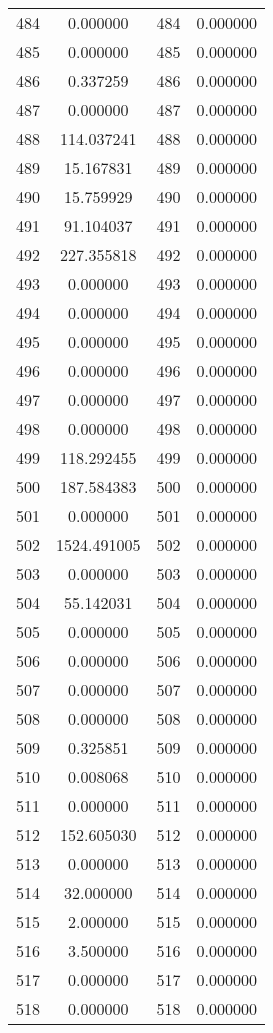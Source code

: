 \documentclass[12pt]{article}
\begin{document}
\begin{longtable}{@{}cccc@{}}
484 & 0.000000 & 484 & 0.000000 \\
485 & 0.000000 & 485 & 0.000000 \\
486 & 0.337259 & 486 & 0.000000 \\
487 & 0.000000 & 487 & 0.000000 \\
488 & 114.037241 & 488 & 0.000000 \\
489 & 15.167831 & 489 & 0.000000 \\
490 & 15.759929 & 490 & 0.000000 \\
491 & 91.104037 & 491 & 0.000000 \\
492 & 227.355818 & 492 & 0.000000 \\
493 & 0.000000 & 493 & 0.000000 \\
494 & 0.000000 & 494 & 0.000000 \\
495 & 0.000000 & 495 & 0.000000 \\
496 & 0.000000 & 496 & 0.000000 \\
497 & 0.000000 & 497 & 0.000000 \\
498 & 0.000000 & 498 & 0.000000 \\
499 & 118.292455 & 499 & 0.000000 \\
500 & 187.584383 & 500 & 0.000000 \\
501 & 0.000000 & 501 & 0.000000 \\
502 & 1524.491005 & 502 & 0.000000 \\
503 & 0.000000 & 503 & 0.000000 \\
504 & 55.142031 & 504 & 0.000000 \\
505 & 0.000000 & 505 & 0.000000 \\
506 & 0.000000 & 506 & 0.000000 \\
507 & 0.000000 & 507 & 0.000000 \\
508 & 0.000000 & 508 & 0.000000 \\
509 & 0.325851 & 509 & 0.000000 \\
510 & 0.008068 & 510 & 0.000000 \\
511 & 0.000000 & 511 & 0.000000 \\
512 & 152.605030 & 512 & 0.000000 \\
513 & 0.000000 & 513 & 0.000000 \\
514 & 32.000000 & 514 & 0.000000 \\
515 & 2.000000 & 515 & 0.000000 \\
516 & 3.500000 & 516 & 0.000000 \\
517 & 0.000000 & 517 & 0.000000 \\
518 & 0.000000 & 518 & 0.000000 \\

\end{longtable}
\end{document}
